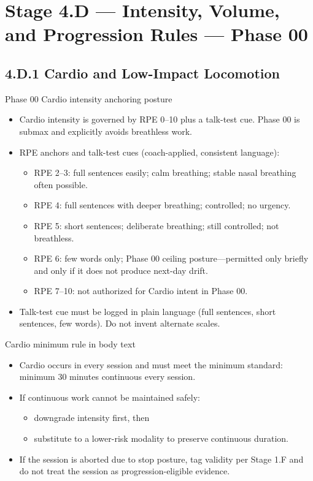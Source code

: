 \documentclass[10pt]{article}
\begin{document}
\section*{Stage 4.D — Intensity, Volume, and Progression Rules — Phase 00}
{}

\subsection*{4.D.1 Cardio and Low-Impact Locomotion}
{}

Phase 00 Cardio intensity anchoring posture

\begin{itemize}
\item Cardio intensity is governed by RPE 0–10 plus a talk-test cue. Phase 00 is submax and explicitly avoids breathless work.
\item RPE anchors and talk-test cues (coach-applied, consistent language):
  \begin{itemize}
  \item RPE 2–3: full sentences easily; calm breathing; stable nasal breathing often possible.
  \item RPE 4: full sentences with deeper breathing; controlled; no urgency.
  \item RPE 5: short sentences; deliberate breathing; still controlled; not breathless.
  \item RPE 6: few words only; Phase 00 ceiling posture—permitted only briefly and only if it does not produce next-day drift.
  \item RPE 7–10: not authorized for Cardio intent in Phase 00.
  \end{itemize}
\item Talk-test cue must be logged in plain language (full sentences, short sentences, few words). Do not invent alternate scales.
\end{itemize}

Cardio minimum rule in body text

\begin{itemize}
\item Cardio occurs in every session and must meet the minimum standard: minimum 30 minutes continuous every session.
\item If continuous work cannot be maintained safely:
  \begin{itemize}
  \item downgrade intensity first, then
  \item substitute to a lower-risk modality to preserve continuous duration.
  \end{itemize}
\item If the session is aborted due to stop posture, tag validity per Stage 1.F and do not treat the session as progression-eligible evidence.
\end{itemize}
\end{document}
